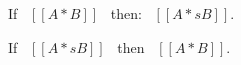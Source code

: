 \begin{lemma}
  If \ $[[A * B]]$ \ then: \ $[[A *s B]]$.
\label{lemma:union:disj-sound}
\end{lemma}

\begin{comment}
\begin{proof}
  By induction on algorithmic disjointness relation.
  \begin{itemize}
    \item Cases \rref{ad-btmr, ad-btml, ad-orl, ad-orr} require induction on hypothesis
          and \Cref{lemma:union:sub-or}.
    \item Cases \rref{ad-intl, ad-intr} require induction on type and \Cref{lemma:union:sub-or}.
  \end{itemize}
\end{proof}
\end{comment}

\begin{lemma}
  If \ $[[A *s B]]$ \ then \ $[[A * B]]$.
\label{lemma:union:disj-complete}
\end{lemma}

\begin{comment}
\begin{proof}
  By induction on type A.
  \begin{itemize}
    \item Case $[[Top]]$ requires \Cref{lemma:union:bl-disj}.
    \item Case $[[Bot]]$ is trivial to prove.
    \item Case $[[Int]]$ requires induction on type B and
          \Cref{lemma:union:bl-disj,lemma:union:disj-sym}.
    \item Case $[[A -> B]]$ requires induction on type B and \Cref{lemma:union:disj-sym}.
    \item Case $[[A \/ B]]$ follows directly from inductive hypothesis.
  \end{itemize}
\end{proof}

\begin{lemma}[Bottom-like Types Disjoint]
\label{lemma:union:bl-disj}
  If \ $[[botlike A]]$ \ then: \ $[[A * B]]$.
\end{lemma}

\begin{lemma}[Disjointness Symmetry]
\label{lemma:union:disj-sym}
  If \ $[[A * B]]$ \ then: \ $[[B * A]]$.
\end{lemma}
\end{comment}

